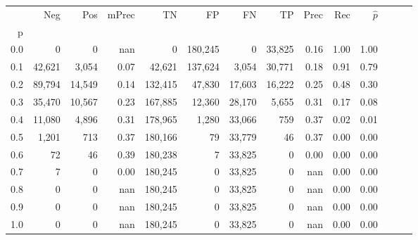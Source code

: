 \begin{tabular}{rrrrrrrrrrrrrr}
\toprule
{} &     Neg &     Pos & mPrec &       TN &       FP &      FN &      TP &  Prec &   Rec & $\hat{p}$ \\
p   &         &         &       &          &          &         &         &       &       &           \\
\midrule
0.0 &       0 &       0 &   nan &        0 &  180,245 &       0 &  33,825 &  0.16 &  1.00 &      1.00 \\
0.1 &  42,621 &   3,054 &  0.07 &   42,621 &  137,624 &   3,054 &  30,771 &  0.18 &  0.91 &      0.79 \\
0.2 &  89,794 &  14,549 &  0.14 &  132,415 &   47,830 &  17,603 &  16,222 &  0.25 &  0.48 &      0.30 \\
0.3 &  35,470 &  10,567 &  0.23 &  167,885 &   12,360 &  28,170 &   5,655 &  0.31 &  0.17 &      0.08 \\
0.4 &  11,080 &   4,896 &  0.31 &  178,965 &    1,280 &  33,066 &     759 &  0.37 &  0.02 &      0.01 \\
0.5 &   1,201 &     713 &  0.37 &  180,166 &       79 &  33,779 &      46 &  0.37 &  0.00 &      0.00 \\
0.6 &      72 &      46 &  0.39 &  180,238 &        7 &  33,825 &       0 &  0.00 &  0.00 &      0.00 \\
0.7 &       7 &       0 &  0.00 &  180,245 &        0 &  33,825 &       0 &   nan &  0.00 &      0.00 \\
0.8 &       0 &       0 &   nan &  180,245 &        0 &  33,825 &       0 &   nan &  0.00 &      0.00 \\
0.9 &       0 &       0 &   nan &  180,245 &        0 &  33,825 &       0 &   nan &  0.00 &      0.00 \\
1.0 &       0 &       0 &   nan &  180,245 &        0 &  33,825 &       0 &   nan &  0.00 &      0.00 \\
\bottomrule
\end{tabular}
